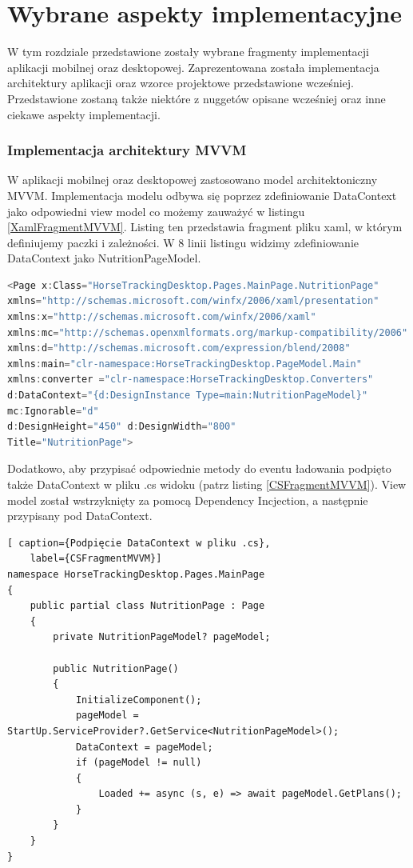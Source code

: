 \documentclass[12pt,oneside]{report}
\begin{document}
\section{Wybrane aspekty implementacyjne}
W tym rozdziale przedstawione zostały wybrane fragmenty implementacji aplikacji mobilnej oraz desktopowej. Zaprezentowana została implementacja architektury aplikacji oraz wzorce projektowe przedstawione wcześniej. Przedstawione zostaną także niektóre z nuggetów opisane wcześniej oraz inne ciekawe aspekty implementacji.
\subsubsection{Implementacja architektury MVVM}
W aplikacji mobilnej oraz desktopowej zastosowano model architektoniczny MVVM. Implementacja modelu odbywa się poprzez zdefiniowanie DataContext jako odpowiedni view model co możemy zauważyć w listingu \ref{XamlFragmentMVVM}. Listing ten przedstawia fragment pliku xaml, w którym definiujemy paczki i zależności. W 8 linii listingu widzimy zdefiniowanie DataContext jako NutritionPageModel. \\
\begin{lstlisting}[language=C, caption={Fragment kodu xaml},
	label={XamlFragmentMVVM}]		
<Page x:Class="HorseTrackingDesktop.Pages.MainPage.NutritionPage"
xmlns="http://schemas.microsoft.com/winfx/2006/xaml/presentation"
xmlns:x="http://schemas.microsoft.com/winfx/2006/xaml"
xmlns:mc="http://schemas.openxmlformats.org/markup-compatibility/2006"
xmlns:d="http://schemas.microsoft.com/expression/blend/2008"
xmlns:main="clr-namespace:HorseTrackingDesktop.PageModel.Main"
xmlns:converter ="clr-namespace:HorseTrackingDesktop.Converters"
d:DataContext="{d:DesignInstance Type=main:NutritionPageModel}"
mc:Ignorable="d"
d:DesignHeight="450" d:DesignWidth="800"
Title="NutritionPage">
\end{lstlisting}
Dodatkowo, aby przypisać odpowiednie metody do eventu ładowania podpięto także DataContext w pliku .cs widoku (patrz listing \ref{CSFragmentMVVM}).  View model został wstrzyknięty za pomocą Dependency Incjection, a następnie przypisany pod DataContext. \\
\begin{lstlisting}[ caption={Podpięcie DataContext w pliku .cs},
	label={CSFragmentMVVM}]	
namespace HorseTrackingDesktop.Pages.MainPage
{
	public partial class NutritionPage : Page
	{
		private NutritionPageModel? pageModel;
			
		public NutritionPage()
		{
			InitializeComponent();
			pageModel = StartUp.ServiceProvider?.GetService<NutritionPageModel>();
			DataContext = pageModel;
			if (pageModel != null)
			{
				Loaded += async (s, e) => await pageModel.GetPlans();
			}
		}
	}
}
\end{lstlisting}
\end{document}
